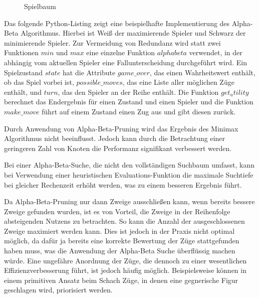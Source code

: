 \begin{figure}
    \centering
    \caption{Spielbaum}
    \label{fig:game_tree_ab_pruning}
\end{figure}

Das folgende Python-Listing zeigt eine beispielhafte Implementierung des Alpha-Beta Algorithmus. Hierbei ist Weiß der
maximierende Spieler und Schwarz der minimierende Spieler. Zur Vermeidung von Redundanz wird statt zwei Funktionen $min$
und $max$ eine einzelne Funktion $alphabeta$ verwendet, in der abhängig vom aktuellen Spieler eine Fallunterscheidung
durchgeführt wird. Ein Spielzustand $state$ hat die Attribute $game\_over$, das einen Wahrheitswert enthält, ob das Spiel
vorbei ist, $possible\_moves$, das eine Liste aller möglichen Züge enthält, und $turn$, das den Spieler an der Reihe
enthält. Die Funktion $get_utility$ berechnet das Endergebnis für einen Zustand und einen Spieler und die Funktion $make\_move$ führt auf einem Zustand einen Zug aus und gibt diesen zurück.



Durch Anwendung von Alpha-Beta-Pruning wird das Ergebnis des Minimax Algorithmus nicht beeinflusst. Jedoch kann durch
die Betrachtung einer geringeren Zahl von Knoten die Performanz signifikant verbessert werden.

Bei einer Alpha-Beta-Suche, die nicht den vollständigen Suchbaum umfasst, kann bei Verwendung einer heuristischen
Evaluations-Funktion die maximale Suchtiefe bei gleicher Rechenzeit erhöht werden, was zu einem besseren Ergebnis führt.

Da Alpha-Beta-Pruning nur dann Zweige ausschließen kann, wenn bereits bessere Zweige gefunden wurden, ist es von
Vorteil, die Zweige in der Reihenfolge absteigenden Nutzens zu betrachten. So kann die Anzahl der ausgeschlossenen
Zweige maximiert werden kann. Dies ist jedoch in der Praxis nicht optimal möglich, da dafür ja bereits eine korrekte
Bewertung der Züge stattgefunden haben muss, was die Anwendung der Alpha-Beta Suche überflüssig machen würde. Eine
ungefähre Anordnung der Züge, die dennoch zu einer wesentlichen Effizienzverbesserung führt, ist jedoch häufig möglich.
Beispielsweise können in einem primitiven Ansatz beim Schach Züge, in denen eine gegnerische Figur geschlagen wird,
priorisiert werden.

